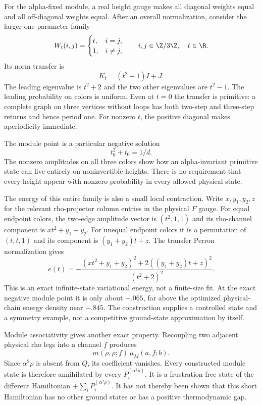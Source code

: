 For the alpha-fixed module, a real height gauge makes all diagonal
weights equal and all off-diagonal weights equal. After an overall
normalization, consider the larger one-parameter family
\[
 W_t(i,j)=\begin{cases}t,&i=j,\\1,&i\ne j,\end{cases}
 \qquad i,j\in\Z/3\Z,\quad t\in\R.
\]
Its norm transfer is
\[
 K_t=(t^2-1)I+J.
\]
The leading eigenvalue is $t^2+2$ and the two other eigenvalues are
$t^2-1$. The leading probability on colors is uniform. Even at $t=0$
the transfer is primitive: a complete graph on three vertices without
loops has both two-step and three-step returns and hence period one.
For nonzero $t$, the positive diagonal makes aperiodicity immediate.

The module point is a particular negative solution
\[
 t_0^2+t_0=1/d.
\]
The nonzero amplitudes on all three colors show how an alpha-invariant
primitive state can live entirely on noninvertible heights. There is
no requirement that every height appear with nonzero probability in
every allowed physical state.

The energy of this entire family is also a small local contraction.
Write $x,y_1,y_2,z$ for the relevant rho-projector column entries in
the physical $F$ gauge. For equal endpoint colors, the two-edge
amplitude vector is $(t^2,1,1)$ and its rho-channel component is
$xt^2+y_1+y_2$. For unequal endpoint colors it is a permutation of
$(t,t,1)$ and its component is $(y_1+y_2)t+z$. The transfer Perron
normalization gives
\begin{equation}
 e(t)=-\frac{(xt^2+y_1+y_2)^2+
                   2((y_1+y_2)t+z)^2}{(t^2+2)^2}.
 \label{eq:scalar-edge-energy}
\end{equation}
This is an exact infinite-state variational energy, not a finite-size
fit. At the exact negative module point it is only about $-.065$,
far above the optimized physical-chain energy density near $-.845$.
The construction supplies a controlled state and a symmetry example,
not a competitive ground-state approximation by itself.

Module associativity gives another exact property. Recoupling two
adjacent physical rho legs into a channel $f$ produces
\[
 m(\rho,\rho;f)\,\mu_M(a,f;b).
\]
Since $\alpha^2\rho$ is absent from $Q$, its coefficient vanishes.
Every constructed module state is therefore annihilated by every
$P_i^{(\alpha^2\rho)}$. It is a frustration-free state of the
different Hamiltonian $+\sum_iP_i^{(\alpha^2\rho)}$. It has not
thereby been shown that this short Hamiltonian has no other ground
states or has a positive thermodynamic gap.

